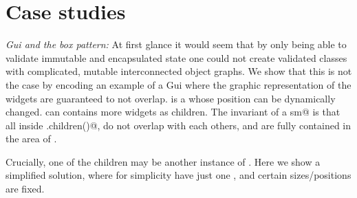 \saveSpace
\section{Case studies}
\label{s:patterns}
\saveSpace

%
%
%
%
%
%
%

\noindent\textit{Gui and the box pattern:}
%
At first glance it would seem that by only being able to validate immutable and encapsulated state one could not create validated classes with complicated, mutable interconnected object graphs.
We show that this is not the case by encoding
an example of a Gui where the graphic representation of the widgets are guaranteed to not overlap.
\Q@SafeMovable@ is a \Q@Widget@ whose position can be dynamically changed.
\Q@Widget@s can contains more widgets as children.
The invariant of a \Q@SafeMovable sm@
is that all \Q@Widget@s inside \Q@sm.children()@,
do not overlap with each others, and are
fully contained in the area of \Q@sm@.

Crucially, one of the children may be another
instance of \Q@SafeMovable@.
Here we show a simplified solution,
where for simplicity \Q@SafeMovable@ have just one
\Q@Button@, and certain sizes/positions are fixed.

